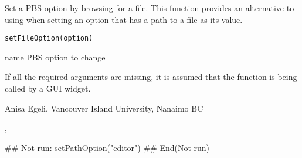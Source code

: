 \documentclass[letterpaper]{book}
\begin{document}
\begin{Description}\relax
Set a PBS option by browsing for a file. This function provides 
an alternative to using  when setting an 
option that has a path to a file as its value.
\end{Description}
\begin{Usage}
\begin{verbatim}
setFileOption(option)
\end{verbatim}
\end{Usage}
\begin{Arguments}
\begin{ldescription}
\item[\code{option}] name PBS option to change
\end{ldescription}
\end{Arguments}
\begin{Note}\relax
If all the required arguments are missing, it is assumed that 
the function is being called by a GUI widget.
\end{Note}
\begin{Author}\relax
Anisa Egeli, Vancouver Island University, Nanaimo BC
\end{Author}
\begin{SeeAlso}\relax
{}, 
\end{SeeAlso}
\begin{Examples}
\begin{ExampleCode}
## Not run: 
setPathOption("editor")
## End(Not run)
\end{ExampleCode}
\end{Examples}
\end{document}
